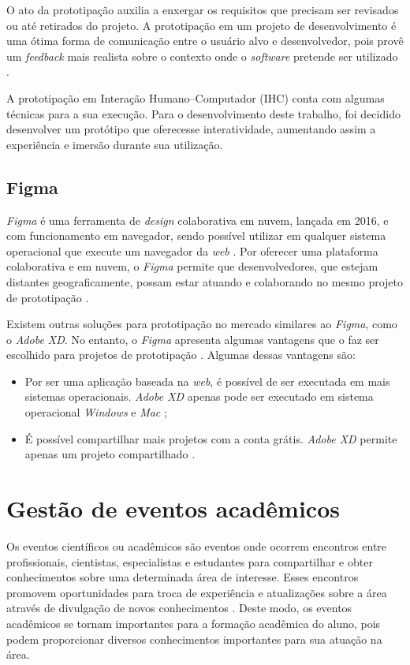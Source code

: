 O ato da prototipação auxilia a enxergar os requisitos que precisam ser revisados ou até retirados do projeto. A prototipação em um projeto de desenvolvimento é uma ótima forma de comunicação entre o usuário alvo e desenvolvedor, pois provê um \textit{feedback} mais realista sobre o contexto onde o \textit{software} pretende ser utilizado \cite{prototipacao}.

A prototipação em Interação Humano–Computador (IHC) conta com algumas técnicas para a sua execução. Para o desenvolvimento deste trabalho, foi decidido desenvolver um protótipo que oferecesse interatividade, aumentando assim a experiência e imersão durante sua utilização.

\subsection{Figma}

\textit{Figma} é uma ferramenta de \textit{design} colaborativa em nuvem, lançada em 2016, e com funcionamento em navegador, sendo possível utilizar em qualquer sistema operacional que execute um navegador da \textit{web} \cite{nguyen}. Por oferecer uma plataforma colaborativa e em nuvem, o \textit{Figma} permite que desenvolvedores, que estejam distantes geograficamente, possam estar atuando e colaborando no mesmo projeto de prototipação \cite{nascimento}.

Existem outras soluções para prototipação no mercado similares ao \textit{Figma}, como o \textit{Adobe XD}. No entanto, o \textit{Figma} apresenta algumas vantagens que o faz ser escolhido para projetos de prototipação \cite{teplov}. Algumas dessas vantagens são:

\begin{itemize}
    \item Por ser uma aplicação baseada na \textit{web}, é possível de ser executada em mais sistemas operacionais. \textit{Adobe XD} apenas pode ser executado em sistema operacional \textit{Windows} e \textit{Mac} \cite{teplov};
    \item É possível compartilhar mais projetos com a conta grátis. \textit{Adobe XD} permite apenas um projeto compartilhado \cite{teplov}.
\end{itemize}

\section{Gestão de eventos acadêmicos}

Os eventos científicos ou acadêmicos são eventos onde ocorrem encontros entre profissionais, cientistas, especialistas e estudantes para compartilhar e obter conhecimentos sobre uma determinada área de interesse. Esses encontros promovem oportunidades para troca de experiência e atualizações sobre a área através de divulgação de novos conhecimentos \cite{lacerda}. Deste modo, os eventos acadêmicos se tornam importantes para a formação acadêmica do aluno, pois podem proporcionar diversos conhecimentos importantes para sua atuação na área.

